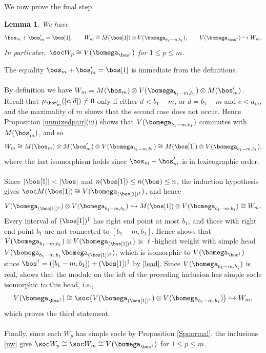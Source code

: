\documentclass[11pt,reqno]{amsart}
\newtheorem*{lem}{Lemma}
\theoremstyle{definition} \newtheorem*{defn}{Definition}
\theoremstyle{definition}
\newenvironment{pf}{\proof}{\endproof}
\numberwithin{equation}{section}
\begin{document}
\subsubsection{} We now prove the final step.
\begin{lem}\label{wm}
We have
$$\bos_m+\bos_m'=\bos[1],\qquad W_m\cong M(\bos[1])\otimes V(\bomega_{b_1-m,b_1}),\qquad
V(\bomega_{\bos^\dagger})\hookrightarrow W_m.$$
In particular, $\soc W_p\cong V(\bomega_{\bos^\dagger})$ for $1\le p\le m$.
\end{lem}
\begin{pf} The equality $\bos_m+\bos_m'=\bos[1]$ is immediate from the definitions.
\\\\
By definition we have $W_m=M(\bos_m)\otimes V(\bomega_{b_1-m,b_1})\otimes M(\bos'_m)$. Recall that
$\mu_{\bos'_m}([c,d])\neq 0$ only if either $d<b_1-m$, or $d=b_1-m$ and $c<a_m$, and the maximality of
$m$ shows that the second case does not occur. Hence Proposition \ref{unmixedpair}(iii) shows that
$V(\bomega_{b_1-m,b_1})$ commutes with $M(\bos'_m)$, and so
$$W_m\cong M(\bos_m)\otimes M(\bos'_m)\otimes V(\bomega_{b_1-m,b_1})\cong M(\bos[1])\otimes
V(\bomega_{b_1-m,b_1}),$$
where the last isomorphism holds since $\bos_m+\bos'_m$ is in lexicographic order.
\\\\
Since $|\bos[1]|<|\bos|$ and $n(\bos[1])\le n(\bos)\le n$, the induction hypothesis gives
$\soc M(\bos[1])\cong V(\bomega_{(\bos[1])^\dagger})$, and hence
$$V(\bomega_{(\bos[1])^\dagger})\otimes V(\bomega_{b_1-m,b_1})\hookrightarrow M(\bos[1])\otimes
V(\bomega_{b_1-m,b_1})\cong W_m.$$
Every interval of $(\bos[1])^\dagger$ has right end point at most $b_1$, and those with right end
point $b_1$ are not connected to $[b_1-m,b_1]$. Hence \cite[Corollary 3.2]{BC25b} shows that
$V(\bomega_{b_1-m,b_1})\otimes V(\bomega_{(\bos[1])^\dagger})$ is $\ell$-highest weight with simple head
$V(\bomega_{b_1-m,b_1}\bomega_{(\bos[1])^\dagger})$, which is isomorphic to $V(\bomega_{\bos^\dagger})$ since
$\bos^\dagger=([b_1-m,b_1])+(\bos[1])^\dagger$ by \eqref{lead}. Since $V(\bomega_{b_1-m,b_1})$ is real,
\cite[Theorem 3.12]{KKKO15} shows that the module on the left of the preceding inclusion has simple
socle isomorphic to this head, i.e.,
$$V(\bomega_{\bos^\dagger}) \cong \soc \big(V(\bomega_{(\bos[1])^\dagger})\otimes
V(\bomega_{b_1-m,b_1})\big)\hookrightarrow W_m,$$
which proves the third statement.
\\\\
Finally, since each $W_p$ has simple socle by Proposition \ref{Spnormal}, the inclusions
\eqref{uw} give $\soc W_p\cong\soc W_m\cong V(\bomega_{\bos^\dagger})$ for $1\le p\le m$.
\end{pf}
\end{document}
